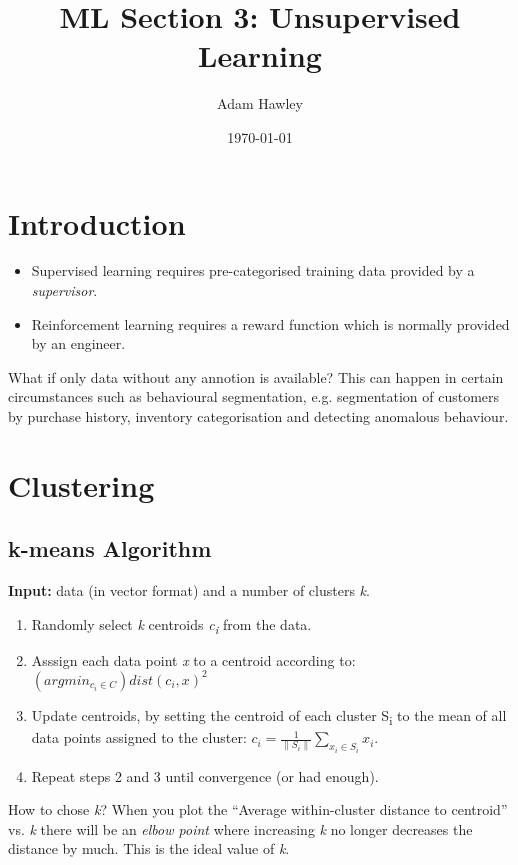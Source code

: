 \documentclass[11pt]{article}
\author{Adam Hawley}
\date{\today}
\title{ML Section 3: Unsupervised Learning}
\begin{document}
\maketitle
\tableofcontents


\section{Introduction}
\label{sec:orgf115edd}
\begin{itemize}
\item Supervised learning requires pre-categorised training data provided by a \emph{supervisor}.
\item Reinforcement learning requires a reward function which is normally provided by an engineer.
\end{itemize}
What if only data without any annotion is available?
This can happen in certain circumstances such as behavioural segmentation, e.g. segmentation of customers by purchase history, inventory categorisation and detecting anomalous behaviour.

\section{Clustering}
\label{sec:orgc265dc1}
\subsection{k-means Algorithm}
\label{sec:orgbda48a9}
\textbf{Input:} data (in vector format) and a number of clusters \emph{k}.
\begin{enumerate}
\item Randomly select \emph{k} centroids \emph{c\textsubscript{i}} from the data.
\item Asssign each data point \emph{x} to a centroid according to: \((argmin_{c_i \in C}) dist(c_i,x)^2\)
\item Update centroids, by setting the centroid of each cluster S\textsubscript{i} to the mean of all data points assigned to the cluster: \(c_i = \frac{1}{\|S_i\|}\sum\limits_{x_i \in S_i} x_i\).
\item Repeat steps 2 and 3 until convergence (or had enough).
\end{enumerate}
How to chose \emph{k}?
When you plot the ``Average within-cluster distance to centroid'' vs. \emph{k} there will be an \emph{elbow point} where increasing \emph{k} no longer decreases the distance by much.
This is the ideal value of \emph{k}.
\end{document}
